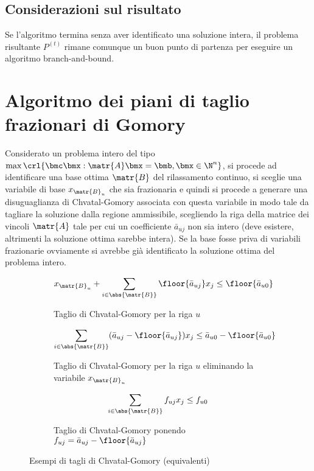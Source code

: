 \documentclass[\main/main.tex]{subfiles}
\begin{document}
\subsection{Considerazioni sul risultato}
Se l'algoritmo termina senza aver identificato una soluzione intera, il problema risultante \(P^{(t)}\) rimane comunque un buon punto di partenza per eseguire un algoritmo branch-and-bound.
\clearpage
\section{Algoritmo dei piani di taglio frazionari di Gomory}
Considerato un problema intero del tipo \(\max\crl{\bmc\bmx: \matr{A}\bmx = \bmb, \bmx \in \N^n}\), si procede ad identificare una base ottima \(\matr{B}\) del rilassamento continuo, si sceglie una variabile di base \(x_{\matr{B}_u}\) che sia frazionaria e quindi si procede a generare una disuguaglianza di Chvatal-Gomory associata con questa variabile in modo tale da tagliare la soluzione dalla regione ammissibile, scegliendo la riga della matrice dei vincoli \(\matr{A}\) tale per cui un coefficiente \(\bar{a}_{uj}\) non sia intero (deve esistere, altrimenti la soluzione ottima sarebbe intera). Se la base fosse priva di variabili frazionarie ovviamente si avrebbe già identificato la soluzione ottima del problema intero.

\begin{figure}
    \begin{subfigure}{0.33\textwidth}
        \[
            x_{\matr{B}_u} + \sum_{i \in \abs{\matr{B}}} \floor{\bar{a}_{uj}}x_j \leq \floor{\bar{a}_{u0}}
        \]        \caption{Taglio di Chvatal-Gomory per la riga \(u\)}
    \end{subfigure}
    \begin{subfigure}{0.33\textwidth}
        \[
            \sum_{i \in \abs{\matr{B}}} (\bar{a}_{uj} - \floor{\bar{a}_{uj}})x_j \leq \bar{a}_{u0} - \floor{\bar{a}_{u0}}
        \]        \caption{Taglio di Chvatal-Gomory per la riga \(u\) eliminando la variabile \(x_{\matr{B}_u}\)}
    \end{subfigure}
    \begin{subfigure}{0.33\textwidth}
        \[
            \sum_{i \in \abs{\matr{B}}} f_{uj}x_j \leq f_{u0}
        \]        \caption{Taglio di Chvatal-Gomory ponendo \(f_{uj} = \bar{a}_{uj} - \floor{\bar{a}_{uj}}\) }
    \end{subfigure}
\caption{Esempi di tagli di Chvatal-Gomory (equivalenti)}
\end{figure}
\end{document}

